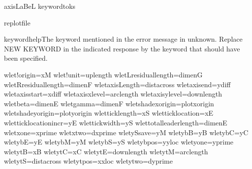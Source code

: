 \newtoks\!axisLaBeL             %
\newtoks\!keywordtoks           %

\newwrite\!replotfile           %

\newhelp\!keywordhelp{The keyword mentioned in the error message in unknown. 
Replace NEW KEYWORD in the indicated response by the keyword that 
should have been specified.}    %

\!wlet\!!origin=\!xM                   %
\!wlet\!!unit=\!uplength               %
\!wlet\!Lresiduallength=\!dimenG       %
\!wlet\!Rresiduallength=\!dimenF       %
\!wlet\!axisLength=\!distacross        %
\!wlet\!axisend=\!ydiff                %
\!wlet\!axisstart=\!xdiff              %
\!wlet\!axisxlevel=\!arclength         %
\!wlet\!axisylevel=\!downlength        %
\!wlet\!beta=\!dimenE                  %
\!wlet\!gamma=\!dimenF                 %
\!wlet\!shadexorigin=\!plotxorigin     %
\!wlet\!shadeyorigin=\!plotyorigin     %
\!wlet\!ticklength=\!xS                %
\!wlet\!ticklocation=\!xE              %
\!wlet\!ticklocationincr=\!yE          %
\!wlet\!tickwidth=\!yS                 %
\!wlet\!totalleaderlength=\!dimenE     %
\!wlet\!xone=\!xprime                  %
\!wlet\!xtwo=\!dxprime                 %
\!wlet\!ySsave=\!yM                    %
\!wlet\!ybB=\!yB                       %
\!wlet\!ybC=\!yC                       %
\!wlet\!ybE=\!yE                       %
\!wlet\!ybM=\!yM                       %
\!wlet\!ybS=\!yS                       %
\!wlet\!ybpos=\!yyloc                  %
\!wlet\!yone=\!yprime                  %
\!wlet\!ytB=\!xB                       %
\!wlet\!ytC=\!xC                       %
\!wlet\!ytE=\!downlength               %
\!wlet\!ytM=\!arclength                %
\!wlet\!ytS=\!distacross               %
\!wlet\!ytpos=\!xxloc                  %
\!wlet\!ytwo=\!dyprime                 %


